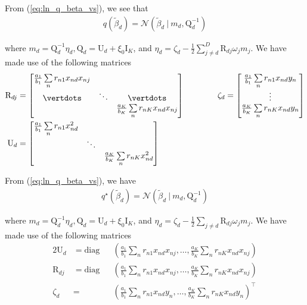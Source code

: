 \documentclass[twoside,11pt]{article}
\newcommand\given[1][]{\:#1\vert\:}
\newcommand{\transpose}[1]{#1^{\intercal}}
\newcommand{\nsum}{\sum\limits_{n}}
\newcommand{\betad}{\tilde{\beta}_d}
\newcommand{\umat}{\mathrm{U}}
\newcommand{\qmat}{\mathrm{Q}}
\begin{document}
From (\ref{eq:ln_q_beta_vs}), we see that
\begin{align*}
	q(\betad) = \mathcal{N} \left( \betad \given m_d, \qmat_d^{-1} \right)
\end{align*}

where $m_d = \qmat_d^{-1} \eta_d, \qmat_d = \umat_d + \xi_0 \mathrm{I}_K$, and $\eta_d = \zeta_d - \frac{1}{2} \sum\limits_{j \neq d}^D \mathrm{R}_{dj} \omega_j m_j$. We have made use of the following matrices
\begin{align*}
\mathrm{R}_{dj} & = \begin{bmatrix} 
\frac{a_1}{b_1} \nsum r_{n1} x_{nd}x_{nj}           &          &          \\ 
\vertdots   &  \ddots    & \vertdots \\
            &          & \frac{a_K}{b_K} \nsum r_{nK} x_{nd}x_{nj}        \\
\end{bmatrix} \quad \quad \quad \quad
\zeta_d =  \begin{bmatrix} 
\frac{a_1}{b_1} \nsum r_{n1} x_{nd}y_{n} \\ 
\vdots   \\
\frac{a_K}{b_K} \nsum r_{nK} x_{nd}y_{n} \\
\end{bmatrix} \\
\umat_d & = \begin{bmatrix} 
\frac{a_1}{b_1} \nsum r_{n1} x_{nd}^2            &               &  \\ 
            &  \ddots       &  \\
            &               & \frac{a_K}{b_K} \nsum r_{nK} x_{nd}^2 \\
\end{bmatrix}
\end{align*}


From (\ref{eq:ln_q_beta_vs}), we have
\begin{align*}
	q^{\star}(\betad) = \mathcal{N} \left( \betad \given m_d, \qmat_d^{-1} \right)
\end{align*}

where $m_d = \qmat_d^{-1} \eta_d, \qmat_d = \umat_d + \xi_0 \mathrm{I}_K$, and $\eta_d = \zeta_d - \frac{1}{2} \sum\limits_{j \neq d} \mathrm{R}_{dj} \omega_j m_j$. We have made use of the following matrices
\begin{alignat}{2}
	\umat_d &= \mathrm{diag} &&\left(\frac{a_1}{b_1} \nsum r_{n1} x_{nd}x_{nj}, \ldots, \frac{a_K}{b_K} \nsum r_{nK} x_{nd}x_{nj} \right) \\
	\mathrm{R}_{dj} &= \mathrm{diag} &&\left(\frac{a_1}{b_1} \nsum r_{n1} x_{nd}x_{nj}, \ldots, \frac{a_K}{b_K} \nsum r_{nK} x_{nd}x_{nj} \right) \\
	\zeta_d &= &&\transpose{\left( \frac{a_1}{b_1} \nsum r_{n1} x_{nd}y_{n}, \ldots, \frac{a_K}{b_K} \nsum r_{nK} x_{nd}y_{n} \right)}
\end{alignat}
\end{document}
